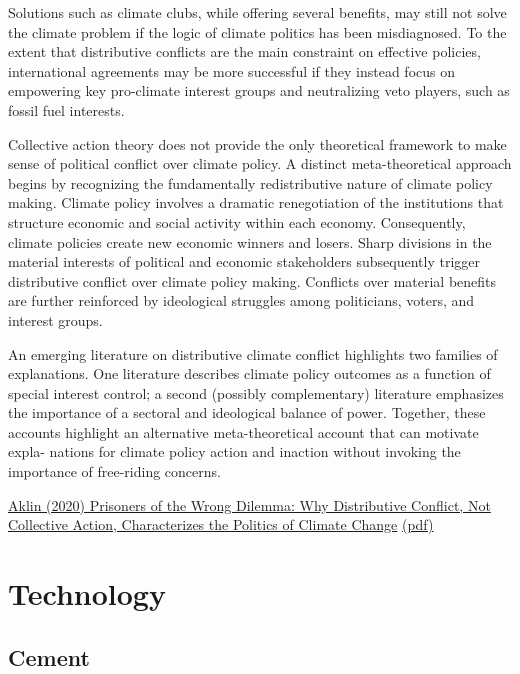 \documentclass[
]{book}
\begin{document}
Solutions such as climate clubs, while offering
several beneﬁts, may still not solve the climate problem if the logic of climate
politics has been misdiagnosed. To the extent that distributive conﬂicts are the
main constraint on effective policies, international agreements may be more
successful if they instead focus on empowering key pro-climate interest groups
and neutralizing veto players, such as fossil fuel interests.

Collective action theory does not provide the only theoretical framework to make
sense of political conﬂict over climate policy. A distinct meta-theoretical approach
begins by recognizing the fundamentally redistributive nature of climate policy
making.
Climate policy involves a dramatic renegotiation of the institutions that
structure economic and social activity within each economy. Consequently, climate
policies create new economic winners and losers. Sharp divisions in the material
interests of political and economic stakeholders subsequently trigger distributive
conﬂict over climate policy making. Conﬂicts over material beneﬁts are further
reinforced by ideological struggles among politicians, voters, and interest groups.

An emerging literature on distributive climate conﬂict highlights two families
of explanations. One literature describes climate policy outcomes as a function of
special interest control; a second (possibly complementary) literature emphasizes
the importance of a sectoral and ideological balance of power. Together, these
accounts highlight an alternative meta-theoretical account that can motivate expla-
nations for climate policy action and inaction without invoking the importance of
free-riding concerns.

\href{https://direct.mit.edu/glep/article/20/4/4/95068/Prisoners-of-the-Wrong-Dilemma-Why-Distributive}{Aklin (2020) Prisoners of the Wrong Dilemma: Why Distributive Conﬂict, Not Collective Action, Characterizes the Politics of Climate Change}
\href{pdf/Aklin_2021_Prisoners_of_Wrong_Dilemma.pdf}{(pdf)}

\hypertarget{technology}{%
\chapter{Technology}\label{technology}}

\hypertarget{cement}{%
\section{Cement}\label{cement}}
\end{document}
